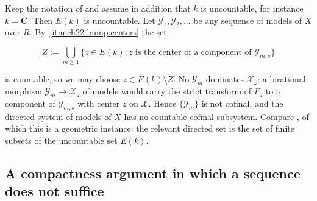 \begin{example}
\label{ex:ch22-no-countable-cofinal}
Keep the notation of  and assume in addition that
\(k\) is uncountable, for instance \(k=\mathbf C\).  Then \(E(k)\) is
uncountable.  Let \(\mathcal Y_1,\mathcal Y_2,\ldots\) be any sequence of
models of \(X\) over \(R\).  By
\,\cref{itm:ch22-bump:centers} the set

\[
 Z:=\bigcup_{m\geq1}\{z\in E(k):
      z\text{ is the center of a component of }\mathcal Y_{m,s}\}
\]

is countable, so we may choose \(z\in E(k)\setminus Z\).  No
\(\mathcal Y_m\) dominates \(\mathcal X_z\): a birational morphism
\(\mathcal Y_m\to\mathcal X_z\) of models would carry the strict transform
of \(F_z\) to a component of \(\mathcal Y_{m,s}\) with center \(z\) on
\(\mathcal X\).  Hence \(\{\mathcal Y_m\}\) is not cofinal, and the directed
system of models of \(X\) has no countable cofinal subsystem.  Compare
, of which this is a geometric instance: the
relevant directed set is the set of finite subsets of the uncountable set
\(E(k)\).
\end{example}

\subsection{A compactness argument in which a sequence does not suffice}

